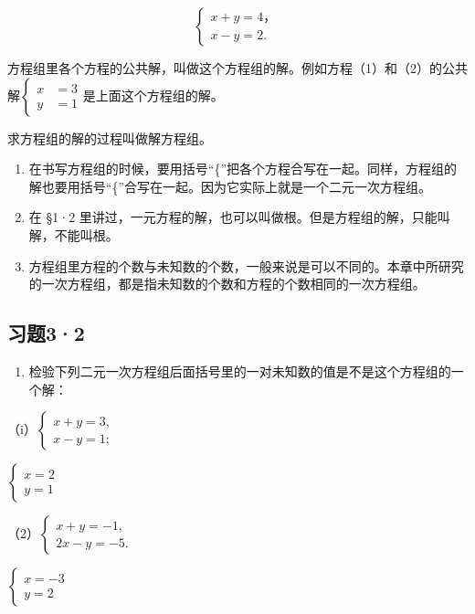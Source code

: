 \[
\left\{ \begin{array}{l} x + y = 4\text{，} \\ x - y = 2. \end{array} \right.
\]

方程组里各个方程的公共解，叫做这个方程组的解。例如方程（1）和（2）的公共解\(\left\{\begin{aligned}x&=3\\ y&=1\end{aligned}\right.\)是上面这个方程组的解。

求方程组的解的过程叫做解方程组。


\begin{enumerate}
\item
  在书写方程组的时候，要用括号``\{''把各个方程合写在一起。同样，方程组的解也要用括号``\{''合写在一起。因为它实际上就是一个二元一次方程组。
\item
  在 §1·2
  里讲过，一元方程的解，也可以叫做根。但是方程组的解，只能叫解，不能叫根。
\item
  方程组里方程的个数与未知数的个数，一般来说是可以不同的。本章中所研究的一次方程组，都是指未知数的个数和方程的个数相同的一次方程组。
\end{enumerate}

\subsection{习题3·2}

\begin{enumerate}
\item
  检验下列二元一次方程组后面括号里的一对未知数的值是不是这个方程组的一个解：
\end{enumerate}

（i）\(\left\{ \begin{array}{l} x + y = 3, \\ x - y = 1; \end{array} \right.\)

\(\left\{ \begin{array}{l} x = 2 \\ y = 1 \end{array} \right.\)

（2）\(\left\{ \begin{array}{l} x + y = -1, \\ 2x - y = -5. \end{array} \right.\)

\(\left\{ \begin{array}{l} x = -3 \\ y = 2 \end{array} \right.\)

